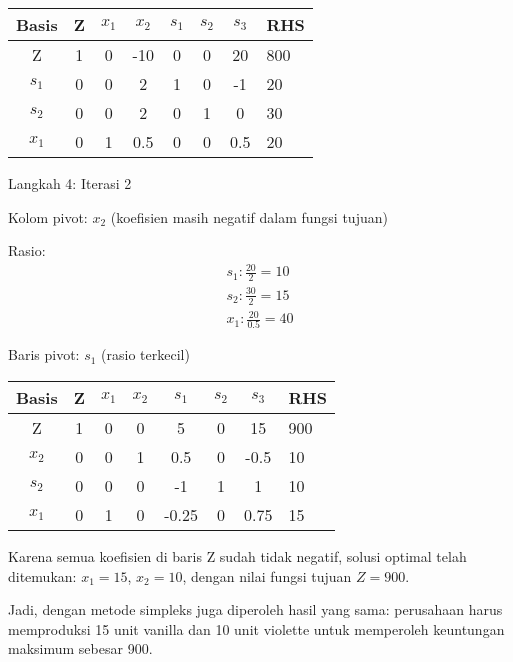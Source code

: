 \documentclass[12pt,a4paper]{article}
\begin{document}
\begin{enumerate}
    \begin{table}[H]
    \centering
    \begin{tabular}{|c|c|c|c|c|c|c|}
    \hline
    Basis & Z & $x_1$ & $x_2$ & $s_1$ & $s_2$ & $s_3$ & RHS \\
    \hline
    Z & 1 & 0 & -10 & 0 & 0 & 20 & 800 \\
    $s_1$ & 0 & 0 & 2 & 1 & 0 & -1 & 20 \\
    $s_2$ & 0 & 0 & 2 & 0 & 1 & 0 & 30 \\
    $x_1$ & 0 & 1 & 0.5 & 0 & 0 & 0.5 & 20 \\
    \hline
    \end{tabular}
    \end{table}
    
    Langkah 4: Iterasi 2
    
    Kolom pivot: $x_2$ (koefisien masih negatif dalam fungsi tujuan)
    
    Rasio:
    \begin{align*}
    s_1: \frac{20}{2} = 10\\  
    s_2: \frac{30}{2} = 15\\  
    x_1: \frac{20}{0.5} = 40
    \end{align*}
    
    Baris pivot: $s_1$ (rasio terkecil)
    
    \begin{table}[H]
    \centering
    \begin{tabular}{|c|c|c|c|c|c|c|}
    \hline
    Basis & Z & $x_1$ & $x_2$ & $s_1$ & $s_2$ & $s_3$ & RHS \\
    \hline
    Z & 1 & 0 & 0 & 5 & 0 & 15 & 900 \\
    $x_2$ & 0 & 0 & 1 & 0.5 & 0 & -0.5 & 10 \\
    $s_2$ & 0 & 0 & 0 & -1 & 1 & 1 & 10 \\
    $x_1$ & 0 & 1 & 0 & -0.25 & 0 & 0.75 & 15 \\
    \hline
    \end{tabular}
    \end{table}
    
    Karena semua koefisien di baris Z sudah tidak negatif, solusi optimal telah ditemukan:
    $x_1 = 15$, $x_2 = 10$, dengan nilai fungsi tujuan $Z = 900$.
    
    Jadi, dengan metode simpleks juga diperoleh hasil yang sama: perusahaan harus memproduksi 15 unit vanilla dan 10 unit violette untuk memperoleh keuntungan maksimum sebesar 900.
\end{enumerate}
\end{document}
